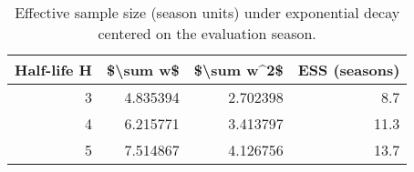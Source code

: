 \begin{table}

\caption{\label{tab:unnamed-chunk-1}Effective sample size (season units) under exponential decay centered on the evaluation season.}
\centering
\begin{tabular}[t]{rrrr}
\toprule
Half-life H & \$\textbackslash{}sum w\$ & \$\textbackslash{}sum w\textasciicircum{}2\$ & ESS (seasons)\\
\midrule
3 & 4.835394 & 2.702398 & 8.7\\
4 & 6.215771 & 3.413797 & 11.3\\
5 & 7.514867 & 4.126756 & 13.7\\
\bottomrule
\end{tabular}
\end{table}
